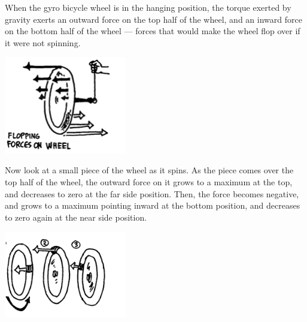When the gyro bicycle wheel is in the hanging position, the torque exerted by gravity exerts an outward force on the top half of the wheel, and an inward force on the bottom half of the wheel --- forces that would make the wheel flop over if it were not spinning.
\begin{center} \includegraphics*[width=0.4\textwidth]{imgs/6labs/6Alab/6Aexp7/6a-sxp7-fig7.png} \end{center}
Now look at a small piece of the wheel as it spins.  As the piece comes over the top half of the wheel, the outward force on it grows to a maximum at the top, and decreases to zero at the far side position.  Then, the force becomes negative, and grows to a maximum pointing inward at the bottom position, and decreases to zero again at the near side position.
\begin{center} \includegraphics*[width=0.4\textwidth]{imgs/6labs/6Alab/6Aexp7/6a-exp7-fig8.png} \end{center}


